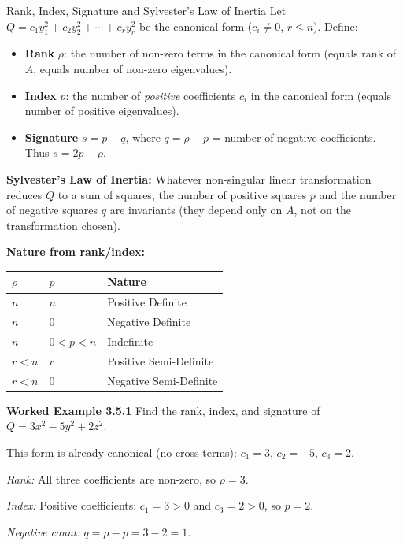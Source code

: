 \documentclass[12pt,a4paper]{article}
\begin{document}
\begin{infobox}{Rank, Index, Signature and Sylvester's Law of Inertia}
Let $Q = c_1 y_1^{2} + c_2 y_2^{2} + \cdots + c_r y_r^{2}$ be the canonical form ($c_i \neq 0$, $r \leq n$). Define:

\begin{itemize}[leftmargin=1.5em]
  \item \textbf{Rank} $\rho$: the number of non-zero terms in the canonical form (equals rank of $A$, equals number of non-zero eigenvalues).
  \item \textbf{Index} $p$: the number of \emph{positive} coefficients $c_i$ in the canonical form (equals number of positive eigenvalues).
  \item \textbf{Signature} $s = p - q$, where $q = \rho - p$ = number of negative coefficients. Thus $s = 2p - \rho$.
\end{itemize}

\textbf{Sylvester's Law of Inertia:} Whatever non-singular linear transformation reduces $Q$ to a sum of squares, the number of positive squares $p$ and the number of negative squares $q$ are invariants (they depend only on $A$, not on the transformation chosen).

\textbf{Nature from rank/index:}
\begin{center}
\begin{tabular}{@{}lll@{}}
\toprule
$\rho$ & $p$ & Nature \\
\midrule
$n$ & $n$   & Positive Definite \\
$n$ & $0$   & Negative Definite \\
$n$ & $0<p<n$ & Indefinite \\
$r<n$ & $r$ & Positive Semi-Definite \\
$r<n$ & $0$ & Negative Semi-Definite \\
\bottomrule
\end{tabular}
\end{center}
\end{infobox}

\textbf{Worked Example 3.5.1} Find the rank, index, and signature of $Q = 3x^{2} - 5y^{2} + 2z^{2}$.

This form is already canonical (no cross terms): $c_1 = 3$, $c_2 = -5$, $c_3 = 2$.

\textit{Rank:} All three coefficients are non-zero, so $\rho = 3$.

\textit{Index:} Positive coefficients: $c_1 = 3 > 0$ and $c_3 = 2 > 0$, so $p = 2$.

\textit{Negative count:} $q = \rho - p = 3 - 2 = 1$.
\end{document}
